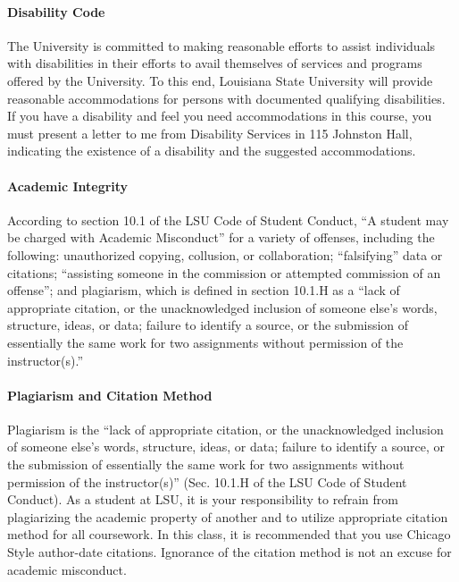 \documentclass[11pt,article,oneside]{memoir}
\begin{document}
\paragraph{Disability Code}
The University is committed to making reasonable efforts to assist individuals with disabilities in
their efforts to avail themselves of services and programs offered by the University. To this end,
Louisiana State University will provide reasonable accommodations for persons with
documented qualifying disabilities. If you have a disability and feel you need accommodations in
this course, you must present a letter to me from Disability Services in 115 Johnston Hall,
indicating the existence of a disability and the suggested accommodations.

\paragraph{Academic Integrity}
According to section 10.1 of the LSU Code of Student Conduct, ``A student may be charged with Academic Misconduct'' for a variety of offenses, including the following: unauthorized copying, collusion, or collaboration; ``falsifying'' data or citations; ``assisting someone in the commission or attempted commission of an offense''; and plagiarism, which is defined in section 10.1.H as a ``lack of appropriate citation, or the unacknowledged inclusion of someone else's words, structure, ideas, or data; failure to identify a source, or the submission of essentially the same work for two assignments without permission of the instructor(s).''

\paragraph{Plagiarism and Citation Method}
Plagiarism is the ``lack of appropriate citation, or the unacknowledged inclusion of someone else's words, structure, ideas, or data; failure to identify a source, or the submission of essentially the same work for two assignments without permission of the instructor(s)'' (Sec. 10.1.H of the LSU Code of Student Conduct). As a student at LSU, it is your responsibility to refrain from plagiarizing the academic property of another and to utilize appropriate citation method for all coursework. In this class, it is recommended that you use Chicago Style author-date citations. Ignorance of the citation method is not an excuse for academic misconduct.
\end{document}
